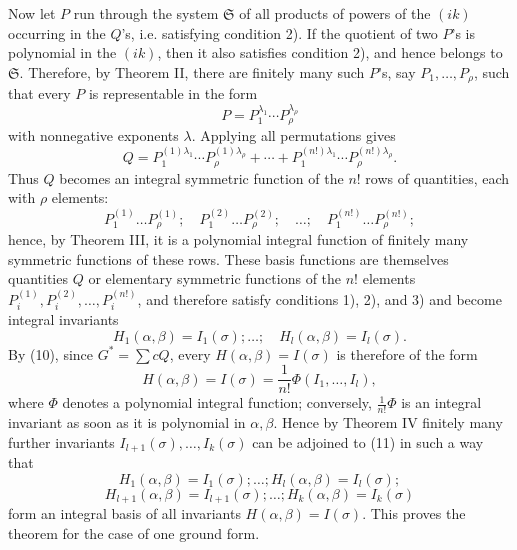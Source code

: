 \documentclass[11pt]{article}
\providecommand{\frS}{\mathfrak S}
\begin{document}
Now let \(P\) run through the system \(\frS\) of all products of powers of the \((ik)\) occurring in the \(Q\)'s, i.e. satisfying condition 2). If the quotient of two \(P\)'s is polynomial in the \((ik)\), then it also satisfies condition 2), and hence belongs to \(\frS\). Therefore, by Theorem II, there are finitely many such \(P\)'s, say \(P_1,\ldots,P_\rho\), such that every \(P\) is representable in the form
\[
        P=P_1^{\lambda_1}\cdots P_\rho^{\lambda_\rho}
\]
with nonnegative exponents \(\lambda\). Applying all permutations gives
\[
        Q=
        P_1^{(1)\lambda_1}\cdots P_\rho^{(1)\lambda_\rho}
        +\cdots+
        P_1^{(n!)\lambda_1}\cdots P_\rho^{(n!)\lambda_\rho}.
\]
Thus \(Q\) becomes an integral symmetric function of the \(n!\) rows of quantities, each with \(\rho\) elements:
\[
        P_1^{(1)}\ldots P_\rho^{(1)};
        \quad
        P_1^{(2)}\ldots P_\rho^{(2)};
        \quad \ldots;\quad
        P_1^{(n!)}\ldots P_\rho^{(n!)};
\]
hence, by Theorem III, it is a polynomial integral function of finitely many symmetric functions of these rows. These basis functions are themselves quantities \(Q\) or elementary symmetric functions of the \(n!\) elements \(P_i^{(1)},P_i^{(2)},\ldots,P_i^{(n!)}\), and therefore satisfy conditions 1), 2), and 3) and become integral invariants
\begin{equation}
        H_1(\alpha,\beta)=I_1(\sigma);\ldots;\quad
        H_l(\alpha,\beta)=I_l(\sigma).
\end{equation}
By (10), since \(G^*=\sum cQ\), every \(H(\alpha,\beta)=I(\sigma)\) is therefore of the form
\[
        H(\alpha,\beta)=I(\sigma)=\frac1{n!}\Phi(I_1,\ldots,I_l),
\]
where \(\Phi\) denotes a polynomial integral function; conversely, \(\frac1{n!}\Phi\) is an integral invariant as soon as it is polynomial in \(\alpha,\beta\). Hence by Theorem IV finitely many further invariants \(I_{l+1}(\sigma),\ldots,I_k(\sigma)\) can be adjoined to (11) in such a way that
\[
        H_1(\alpha,\beta)=I_1(\sigma);\ldots;H_l(\alpha,\beta)=I_l(\sigma);
\]
\[
        H_{l+1}(\alpha,\beta)=I_{l+1}(\sigma);\ldots;H_k(\alpha,\beta)=I_k(\sigma)
\]
form an integral basis of all invariants \(H(\alpha,\beta)=I(\sigma)\). This proves the theorem for the case of one ground form.
\end{document}
